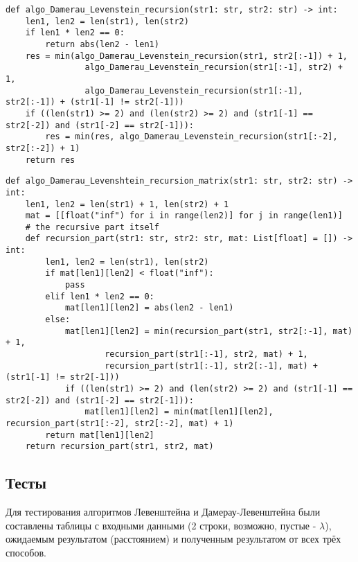 \vspace{0.25cm}
\begin{lstlisting}[caption=реализация рекурсивного алгоритма Дамерау-Левенштейна, label=lst:damerau_levenshtein_recursive]
def algo_Damerau_Levenstein_recursion(str1: str, str2: str) -> int:
    len1, len2 = len(str1), len(str2)
    if len1 * len2 == 0:
        return abs(len2 - len1)
    res = min(algo_Damerau_Levenstein_recursion(str1, str2[:-1]) + 1,
                algo_Damerau_Levenstein_recursion(str1[:-1], str2) + 1,
                algo_Damerau_Levenstein_recursion(str1[:-1], str2[:-1]) + (str1[-1] != str2[-1]))
    if ((len(str1) >= 2) and (len(str2) >= 2) and (str1[-1] == str2[-2]) and (str1[-2] == str2[-1])):
        res = min(res, algo_Damerau_Levenstein_recursion(str1[:-2], str2[:-2]) + 1)
    return res
\end{lstlisting}

\vspace{0.25cm}
\begin{lstlisting}[caption=реализация рекурсивно-матричного алгоритма Дамерау-Левенштейна, label=lst:damerau_levenstein_recursive_matrix]
def algo_Damerau_Levenshtein_recursion_matrix(str1: str, str2: str) -> int:
    len1, len2 = len(str1) + 1, len(str2) + 1
    mat = [[float("inf") for i in range(len2)] for j in range(len1)]
    # the recursive part itself
    def recursion_part(str1: str, str2: str, mat: List[float] = []) -> int:
        len1, len2 = len(str1), len(str2)
        if mat[len1][len2] < float("inf"):
            pass
        elif len1 * len2 == 0:
            mat[len1][len2] = abs(len2 - len1)
        else:
            mat[len1][len2] = min(recursion_part(str1, str2[:-1], mat) + 1,
                    recursion_part(str1[:-1], str2, mat) + 1,
                    recursion_part(str1[:-1], str2[:-1], mat) + (str1[-1] != str2[-1]))
            if ((len(str1) >= 2) and (len(str2) >= 2) and (str1[-1] == str2[-2]) and (str1[-2] == str2[-1])):
                mat[len1][len2] = min(mat[len1][len2], recursion_part(str1[:-2], str2[:-2], mat) + 1)
        return mat[len1][len2]
    return recursion_part(str1, str2, mat)
\end{lstlisting}


\vspace{0.25cm}
\subsection{Тесты}

Для тестирования алгоритмов Левенштейна и Дамерау-Левенштейна были составлены таблицы с входными данными (2 строки, возможно, пустые - $\lambda$), ожидаемым результатом (расстоянием) и полученным результатом от всех трёх способов.

